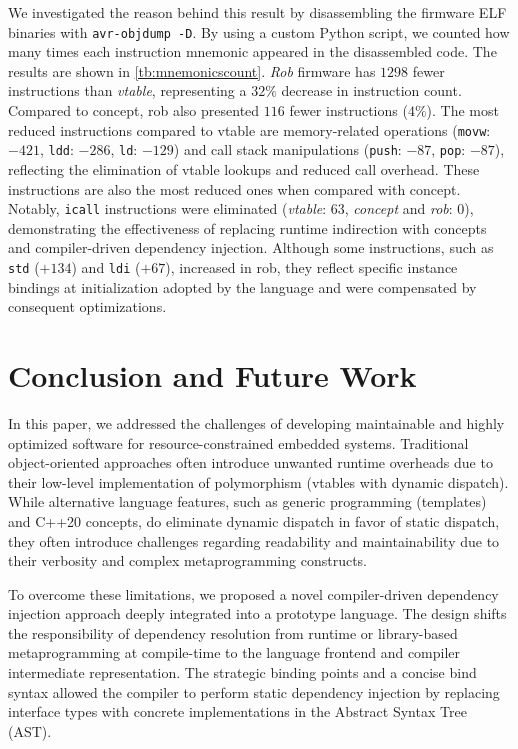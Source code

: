 \documentclass[10pt,sigplan,screen,anonymous]{acmart}
\begin{document}
We investigated the reason behind this result by disassembling the firmware ELF binaries with {\tt avr-objdump -D}. By using a custom Python script, we counted how many times each instruction mnemonic appeared in the disassembled code. The results are shown in \autoref{tb:mnemonicscount}. \emph{Rob} firmware has $1298$ fewer instructions than \emph{vtable}, representing a $32\%$ decrease in instruction count. Compared to concept, rob also presented $116$ fewer instructions ($4\%$). The most reduced instructions compared to vtable are memory-related operations ({\tt movw}: $-421$, {\tt ldd}: $-286$, {\tt ld}: $-129$) and call stack manipulations ({\tt push}: $-87$, {\tt pop}: $-87$), reflecting the elimination of vtable lookups and reduced call overhead. These instructions are also the most reduced ones when compared with concept. Notably, {\tt icall} instructions were eliminated (\emph{vtable}: $63$, \emph{concept} and \emph{rob}: 0), demonstrating the effectiveness of replacing runtime indirection with concepts and compiler-driven dependency injection. Although some instructions, such as {\tt std} ($+134$) and {\tt ldi} ($+67$), increased in rob, they reflect specific instance bindings at initialization adopted by the language and were compensated by consequent optimizations. 




\section{Conclusion and Future Work} \label{sec:conclusion}

In this paper, we addressed the challenges of developing maintainable and highly optimized software for resource-constrained embedded systems. Traditional object-oriented approaches often introduce unwanted runtime overheads due to their low-level implementation of polymorphism (vtables with dynamic dispatch). While alternative language features, such as generic programming (templates) and C++20 concepts, do eliminate dynamic dispatch in favor of static dispatch, they often introduce challenges regarding readability and maintainability due to their verbosity and complex metaprogramming constructs. 

To overcome these limitations, we proposed a novel compiler-driven dependency injection approach deeply integrated into a prototype language. The design shifts the responsibility of dependency resolution from runtime or library-based metaprogramming at compile-time to the language frontend and compiler intermediate representation. The strategic binding points and a concise bind syntax allowed the compiler to perform static dependency injection by replacing interface types with concrete implementations in the Abstract Syntax Tree (AST).
\end{document}
